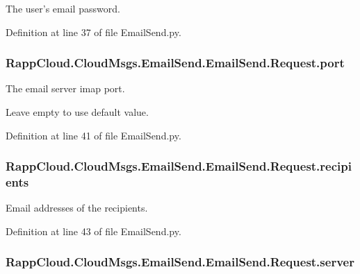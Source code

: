 The user's email password. 



Definition at line 37 of file Email\-Send.\-py.

\hypertarget{classRappCloud_1_1CloudMsgs_1_1EmailSend_1_1EmailSend_1_1Request_ac4521e1068c1e634c76ee75be1c015d0}{
\subsubsection[{port}]{\setlength{\rightskip}{0pt plus 5cm}Rapp\-Cloud.\-Cloud\-Msgs.\-Email\-Send.\-Email\-Send.\-Request.\-port}}\label{classRappCloud_1_1CloudMsgs_1_1EmailSend_1_1EmailSend_1_1Request_ac4521e1068c1e634c76ee75be1c015d0}


The email server imap port. 

Leave empty to use default value. 

Definition at line 41 of file Email\-Send.\-py.

\hypertarget{classRappCloud_1_1CloudMsgs_1_1EmailSend_1_1EmailSend_1_1Request_ab69762f74d75ce786fe0a1b6a0878f6d}{
\subsubsection[{recipients}]{\setlength{\rightskip}{0pt plus 5cm}Rapp\-Cloud.\-Cloud\-Msgs.\-Email\-Send.\-Email\-Send.\-Request.\-recipients}}\label{classRappCloud_1_1CloudMsgs_1_1EmailSend_1_1EmailSend_1_1Request_ab69762f74d75ce786fe0a1b6a0878f6d}


Email addresses of the recipients. 



Definition at line 43 of file Email\-Send.\-py.

\hypertarget{classRappCloud_1_1CloudMsgs_1_1EmailSend_1_1EmailSend_1_1Request_aba5bc698fee8c97a97016f5f7b089915}{
\subsubsection[{server}]{\setlength{\rightskip}{0pt plus 5cm}Rapp\-Cloud.\-Cloud\-Msgs.\-Email\-Send.\-Email\-Send.\-Request.\-server}}\label{classRappCloud_1_1CloudMsgs_1_1EmailSend_1_1EmailSend_1_1Request_aba5bc698fee8c97a97016f5f7b089915}


